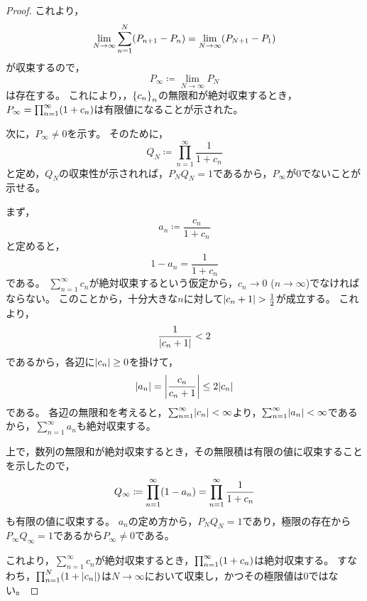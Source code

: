 \documentclass[a4paper,draft]{ltjsarticle}
\begin{document}
\begin{thm}[無限和と無限積の絶対収束]
\begin{proof}
        これより，
        \begin{equation}
            \lim_{N\to\infty}\sum_{n=1}^N \pare{P_{n+1}-P_n}=\lim_{N\to\infty}\pare{P_{N+1}-P_1}
        \end{equation}
        が収束するので，
        \begin{equation}
            P_{\infty}\coloneqq \lim_{N\to\infty}P_N
        \end{equation}
        は存在する。
        これにより，，$\seq{c_n}{n}$の無限和が絶対収束するとき，$P_\infty=\prod_{n=1}^\infty \pare{1+c_n}$は有限値になることが示された。

        次に，$P_\infty\ne0$を示す。
        そのために，
        \begin{equation}
            Q_N\coloneqq \prod_{n=1}^\infty \frac{1}{1+c_n}
        \end{equation}
        と定め，$Q_N$の収束性が示されれば，$P_NQ_N=1$であるから，$P_\infty$が$0$でないことが示せる。

        まず，
        \begin{equation}
            a_n\coloneqq \frac{c_n}{1+c_n}
        \end{equation}
        と定めると，
        \begin{equation}
            1-a_n = \frac{1}{1+c_n}
        \end{equation}
        である。
        $\sum_{n=1}^\infty c_n$が絶対収束するという仮定から，$c_n\to 0$ ($n\to\infty$)でなければならない。
        このことから，十分大きな$n$に対して$\abs{c_n+1}>\frac{1}{2}$が成立する。
        これより，
        \begin{equation}
            \frac{1}{\abs{c_n+1}}<2
        \end{equation}
        であるから，各辺に$\abs{c_n}\geq0$を掛けて，
        \begin{equation}
            \abs{a_n}=\abs{\frac{c_n}{c_n+1}}\leq 2\abs{c_n}
        \end{equation}
        である。
        各辺の無限和を考えると，$\sum_{n=1}^\infty \abs{c_n}<\infty$より，$\sum_{n=1}^\infty \abs{a_n}<\infty$であるから，$\sum_{n=1}^\infty a_n$も絶対収束する。

        上で，数列の無限和が絶対収束するとき，その無限積は有限の値に収束することを示したので，
        \begin{equation}
            Q_{\infty}\coloneqq \prod_{n=1}^\infty \pare{1-a_n}=\prod_{n=1}^\infty \frac{1}{1+c_n}
        \end{equation}
        も有限の値に収束する。
        $a_n$の定め方から，$P_NQ_N=1$であり，極限の存在から$P_\infty Q_\infty=1$であるから$P_\infty\ne 0$である。

        これより，$\sum_{n=1}^\infty c_n$が絶対収束するとき，$\prod_{n=1}^\infty \pare{1+c_n}$は絶対収束する。
        すなわち，$\prod_{n=1}^N \pare{1+\abs{c_n}}$は$N\to\infty$において収束し，かつその極限値は$0$ではない。
    \end{proof}
\end{thm}
\end{document}
